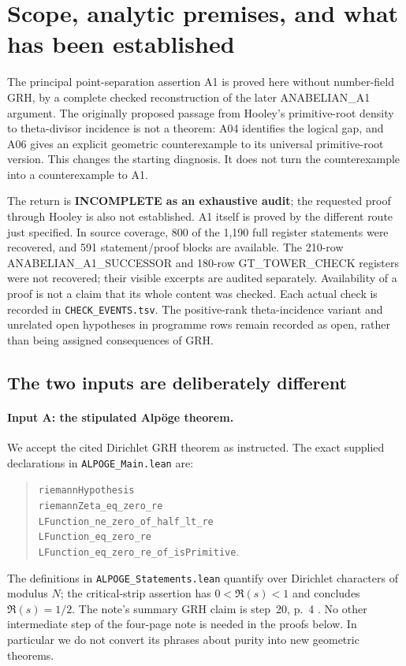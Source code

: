 \documentclass[11pt,a4paper]{article}
\begin{document}
\section{Scope, analytic premises, and what has been established}
\label{sec:premises}

The principal point-separation assertion A1 is proved here without
number-field GRH, by a complete checked reconstruction of the later
ANABELIAN\_A1 argument. The originally proposed passage from Hooley's
primitive-root density to theta-divisor incidence is not a theorem:
A04 identifies the logical gap, and A06 gives an explicit geometric
counterexample to its universal primitive-root version. This changes
the starting diagnosis. It does not turn the counterexample into a
counterexample to A1.

The return is \textbf{INCOMPLETE as an exhaustive audit}; the
requested proof through Hooley is also not established. A1 itself
is proved by the different route just specified. In source coverage,
800 of the 1,190 full register statements were recovered, and 591
statement/proof blocks are available. The 210-row
ANABELIAN\_A1\_SUCCESSOR and 180-row GT\_TOWER\_CHECK registers were not
recovered; their visible excerpts are audited separately. Availability
of a proof is not a claim that its whole content was checked. Each
actual check is recorded in \texttt{CHECK\_EVENTS.tsv}. The positive-rank
theta-incidence variant and unrelated open hypotheses in programme
rows remain recorded as open, rather than being assigned consequences
of GRH.

\subsection{The two inputs are deliberately different}

\paragraph{Input A: the stipulated Alp\"oge theorem.}
We accept the cited Dirichlet GRH theorem as instructed. The exact
supplied declarations in \texttt{ALPOGE\_Main.lean} are:
\begin{quote}\small\raggedright
\texttt{riemannHypothesis}\\
\texttt{riemannZeta\_eq\_zero\_re}\\
\texttt{LFunction\_ne\_zero\_of\_half\_lt\_re}\\
\texttt{LFunction\_eq\_zero\_re}\\
\texttt{LFunction\_eq\_zero\_re\_of\_isPrimitive}.
\end{quote}
The definitions in \texttt{ALPOGE\_Statements.lean} quantify over
Dirichlet characters of modulus $N$; the critical-strip assertion
has $0<\Re(s)<1$ and concludes $\Re(s)=1/2$.
The note's summary GRH claim is step~20, p.~4 \cite{Alpoge}.
No other intermediate step of the four-page note is needed in the
proofs below. In particular we do not convert its phrases about
purity into new geometric theorems.
\end{document}
